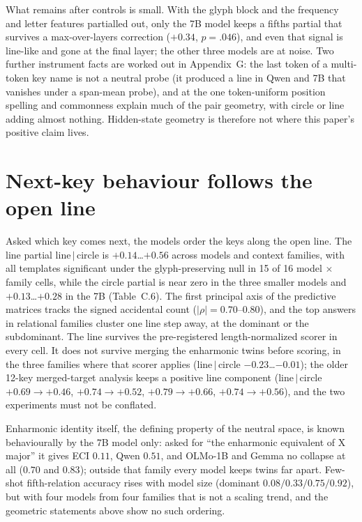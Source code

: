 \documentclass[11pt]{article}
\newcommand{\lc}{line$\,|\,$circle}
\begin{document}
What remains after controls is small. With the glyph block and the frequency and letter features partialled out, only the 7B model keeps a fifths partial that survives a max-over-layers correction ($+0.34$, $p=.046$), and even that signal is line-like and gone at the final layer; the other three models are at noise. Two further instrument facts are worked out in Appendix~G: the last token of a multi-token key name is not a neutral probe (it produced a line in Qwen and 7B that vanishes under a span-mean probe), and at the one token-uniform position spelling and commonness explain much of the pair geometry, with circle or line adding almost nothing. Hidden-state geometry is therefore not where this paper's positive claim lives.

\section{Next-key behaviour follows the open line}\label{sec:behaviour}

\begin{resultbox}
Asked which key comes next, the models order the keys along the open line. The line partial \lc{} is $+0.14$…$+0.56$ across models and context families, with all templates significant under the glyph-preserving null in 15 of 16 model $\times$ family cells, while the circle partial is near zero in the three smaller models and $+0.13$…$+0.28$ in the 7B (Table~C.6). The first principal axis of the predictive matrices tracks the signed accidental count ($|\rho|=0.70$--$0.80$), and the top answers in relational families cluster one line step away, at the dominant or the subdominant. The line survives the pre-registered length-normalized scorer in every cell. It does not survive merging the enharmonic twins before scoring, in the three families where that scorer applies (\lc{} $-0.23$…$-0.01$); the older 12-key merged-target analysis keeps a positive line component (\lc{} $+0.69\to+0.46$, $+0.74\to+0.52$, $+0.79\to+0.66$, $+0.74\to+0.56$), and the two experiments must not be conflated.
\end{resultbox}

Enharmonic identity itself, the defining property of the neutral space, is known behaviourally by the 7B model only: asked for ``the enharmonic equivalent of X major'' it gives ECI $0.11$, Qwen $0.51$, and OLMo-1B and Gemma no collapse at all ($0.70$ and $0.83$); outside that family every model keeps twins far apart. Few-shot fifth-relation accuracy rises with model size (dominant $0.08/0.33/0.75/0.92$), but with four models from four families that is not a scaling trend, and the geometric statements above show no such ordering.
\end{document}
